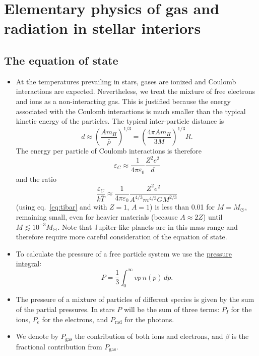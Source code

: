 \documentclass[10pt,amsmath,amssymb,aps,pra]{revtex4-2}
\newcommand{\sub}[1]{_{\text{#1}}}
\newcommand{\eps}{\varepsilon}
\newcommand{\Sun}{\astrosun}
\newcommand{\msun}{M_{\astrosun}}
\begin{document}
\section{Elementary physics of gas and radiation in stellar interiors}

\subsection{The equation of state}
\begin{itemize}
\item At the temperatures prevailing in stars, gases are ionized and Coulomb
interactions are expected. Nevertheless, we treat the mixture of free electrons
and ions as a non-interacting gas. This is justified because the energy
associated with the Coulomb interactions is much smaller than the typical
kinetic energy of the particles. The typical inter-particle distance is
\begin{equation*}
d \approx \left(\frac{Am_H}{\bar{\rho}}\right)^{1/3} =
\left(\frac{4\pi{A}m_H}{3M}\right)^{1/3}R.
\end{equation*}
The energy per particle of Coulomb interactions is therefore
\begin{equation*}
\eps_C \approx \frac{1}{4\pi\eps_0}\frac{Z^2e^2}{d}
\end{equation*}
and the ratio
\begin{equation*}
\frac{\eps_C}{k\bar{T}} \approx
\frac{1}{4\pi\eps_0}\frac{Z^2e^2}{A^{4/3}m^{4/3}GM^{2/3}}
\end{equation*}
(using eq.~\ref{eq:tibar} and with $Z=1$, $A=1$) is less than 0.01 for
$M=M_{\Sun}$, remaining small, even for heavier materials (because $A\approx2Z$)
until $M\lesssim{}10^{-3}\msun{}$. Note that Jupiter-like planets are in this
mass range and therefore require more careful consideration of the equation of
state.

\item To calculate the pressure of a free particle system we use the
\href{run:./pressure_integral.pdf}{pressure integral}:
\begin{equation}
P=\frac{1}{3}\int_0^\infty{v}p\,n(p)\,dp.
\end{equation}

\item The pressure of a mixture of particles of different species is given by
the sum of the partial pressures. In stars $P$ will be the sum of three terms:
$P_I$ for the ions, $P_e$ for the electrons, and $P_\text{rad}$ for the photons.

\item We denote by $P_\text{gas}$ the contribution of both ions and electrons,
and $\beta$ is the fractional contribution from $P\sub{gas}$.
\end{itemize}
\end{document}
